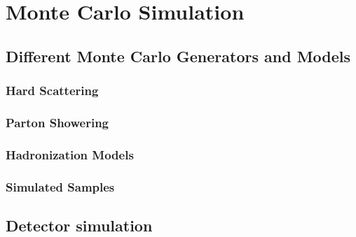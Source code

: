 \chapter{Monte Carlo Simulation}\label{chapt:MC}

\section{Different Monte Carlo Generators and Models}
\subsection{Hard Scattering}
\subsection{Parton Showering}
\subsection{Hadronization Models}
\subsection{Simulated Samples}

\section{Detector simulation}